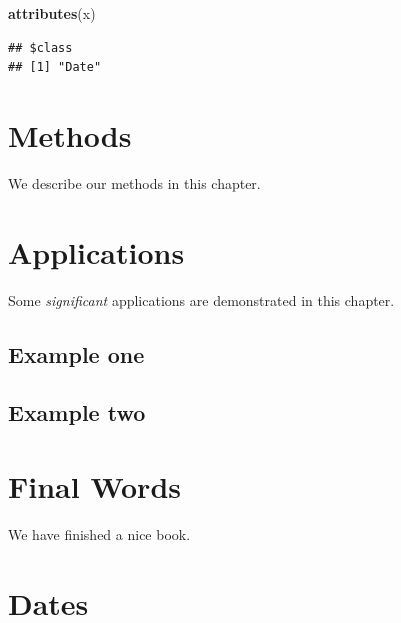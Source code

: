 \documentclass[
]{book}
\newenvironment{Shaded}{\begin{snugshade}}{\end{snugshade}}
\newcommand{\KeywordTok}[1]{\textcolor[rgb]{0.13,0.29,0.53}{\textbf{#1}}}
\newcommand{\NormalTok}[1]{#1}
\begin{document}
\begin{Shaded}
\begin{Highlighting}[]
\KeywordTok{attributes}\NormalTok{(x)}
\end{Highlighting}
\end{Shaded}

\begin{verbatim}
## $class
## [1] "Date"
\end{verbatim}

\hypertarget{methods}{%
\chapter{Methods}\label{methods}}

We describe our methods in this chapter.

\hypertarget{applications}{%
\chapter{Applications}\label{applications}}

Some \emph{significant} applications are demonstrated in this chapter.

\hypertarget{example-one}{%
\section{Example one}\label{example-one}}

\hypertarget{example-two}{%
\section{Example two}\label{example-two}}

\hypertarget{final-words}{%
\chapter{Final Words}\label{final-words}}

We have finished a nice book.

\hypertarget{dates}{%
\chapter{Dates}\label{dates}}

  
\end{document}
